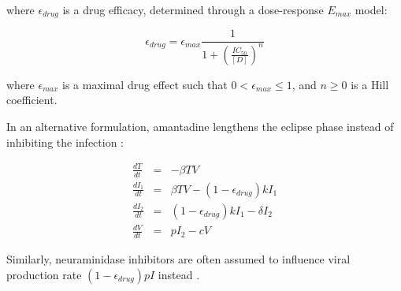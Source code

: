 where $\epsilon_{drug}$ is a drug efficacy, determined through a dose-response $E_{max}$ model:

\begin{equation}
\epsilon_{drug} = \epsilon_{max}\frac{1}{1 + (\frac{IC_{50}}{[D]})^{n}}
\end{equation}

where $\epsilon_{max}$ is a maximal drug effect such that $0 < \epsilon_{max} \le 1$, and $n \ge 0$ is a Hill coefficient.

In an alternative formulation, amantadine lengthens the eclipse phase instead of inhibiting the infection \cite{beauchemin2008modeling}:

\begin{equation}
\begin{array}{rcl}
\frac{dT}{dt} &=& - \beta T V \\
\frac{dI_1}{dt} &=& \beta T V - (1-\epsilon_{drug}) k I_1 \\
\frac{dI_2}{dt} &=& (1-\epsilon_{drug}) k I_1 - \delta I_2 \\
\frac{dV}{dt} &=& p I_2 - c V
\end{array}
\end{equation}

Similarly, neuraminidase inhibitors are often assumed to influence viral production rate $(1-\epsilon_{drug}) p I$ instead \cite{handel2007neuraminidase}.